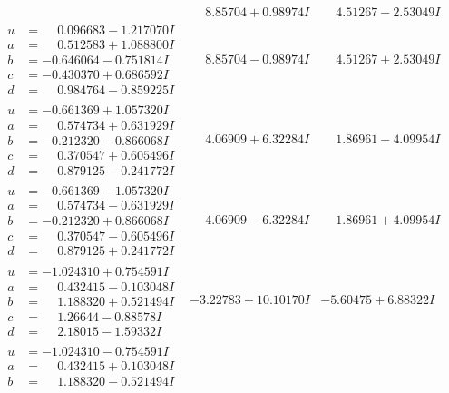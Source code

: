 \documentclass[1p]{elsarticle_modified}
\theoremstyle{definition}
\begin{document}
$$\begin{array}{c|c|c}
 & \phantom{-}8.85704 + 0.98974 I & \phantom{-}4.51267 - 2.53049 I \\ \hline\begin{aligned}
u &= \phantom{-}0.096683 - 1.217070 I \\
a &= \phantom{-}0.512583 + 1.088800 I \\
b &= -0.646064 - 0.751814 I \\
c &= -0.430370 + 0.686592 I \\
d &= \phantom{-}0.984764 - 0.859225 I\end{aligned}
 & \phantom{-}8.85704 - 0.98974 I & \phantom{-}4.51267 + 2.53049 I \\ \hline\begin{aligned}
u &= -0.661369 + 1.057320 I \\
a &= \phantom{-}0.574734 + 0.631929 I \\
b &= -0.212320 - 0.866068 I \\
c &= \phantom{-}0.370547 + 0.605496 I \\
d &= \phantom{-}0.879125 - 0.241772 I\end{aligned}
 & \phantom{-}4.06909 + 6.32284 I & \phantom{-}1.86961 - 4.09954 I \\ \hline\begin{aligned}
u &= -0.661369 - 1.057320 I \\
a &= \phantom{-}0.574734 - 0.631929 I \\
b &= -0.212320 + 0.866068 I \\
c &= \phantom{-}0.370547 - 0.605496 I \\
d &= \phantom{-}0.879125 + 0.241772 I\end{aligned}
 & \phantom{-}4.06909 - 6.32284 I & \phantom{-}1.86961 + 4.09954 I \\ \hline\begin{aligned}
u &= -1.024310 + 0.754591 I \\
a &= \phantom{-}0.432415 - 0.103048 I \\
b &= \phantom{-}1.188320 + 0.521494 I \\
c &= \phantom{-}1.26644 - 0.88578 I \\
d &= \phantom{-}2.18015 - 1.59332 I\end{aligned}
 & -3.22783 - 10.10170 I & -5.60475 + 6.88322 I \\ \hline\begin{aligned}
u &= -1.024310 - 0.754591 I \\
a &= \phantom{-}0.432415 + 0.103048 I \\
b &= \phantom{-}1.188320 - 0.521494 I \\

\end{aligned}
\end{array}$$
\end{document}
